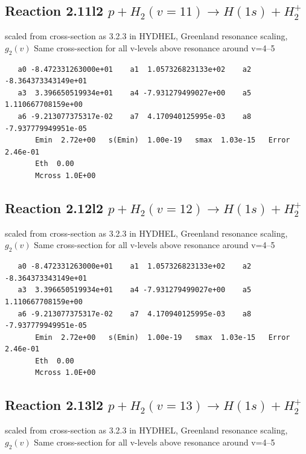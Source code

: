 \documentclass[12pt,dvipdfmx]{article}
\begin{document}
\subsection{
Reaction 2.11l2 $   p + H_2(v=11) \rightarrow H(1s) + H_2^+$}

scaled from cross-section as 3.2.3 in HYDHEL, Greenland resonance scaling, \cite{kn:Green} $g_2(v)$
Same cross-section for all v-levels above resonance around v=4--5

\begin{small}\begin{verbatim}
   a0 -8.472331263000e+01    a1  1.057326823133e+02    a2 -8.364373343149e+01
   a3  3.396650519934e+01    a4 -7.931279499027e+00    a5  1.110667708159e+00
   a6 -9.213077375317e-02    a7  4.170940125995e-03    a8 -7.937779949951e-05
       Emin  2.72e+00   s(Emin)  1.00e-19   smax  1.03e-15   Error  2.46e-01
       Eth  0.00
       Mcross 1.0E+00
\end{verbatim}\end{small}

\subsection{
Reaction 2.12l2 $   p + H_2(v=12) \rightarrow H(1s) + H_2^+$}

scaled from cross-section as 3.2.3 in HYDHEL, Greenland resonance scaling, \cite{kn:Green} $g_2(v)$
Same cross-section for all v-levels above resonance around v=4--5

\begin{small}\begin{verbatim}
   a0 -8.472331263000e+01    a1  1.057326823133e+02    a2 -8.364373343149e+01
   a3  3.396650519934e+01    a4 -7.931279499027e+00    a5  1.110667708159e+00
   a6 -9.213077375317e-02    a7  4.170940125995e-03    a8 -7.937779949951e-05
       Emin  2.72e+00   s(Emin)  1.00e-19   smax  1.03e-15   Error  2.46e-01
       Eth  0.00
       Mcross 1.0E+00
\end{verbatim}\end{small}

\subsection{
Reaction 2.13l2 $   p + H_2(v=13) \rightarrow H(1s) + H_2^+$}

scaled from cross-section as 3.2.3 in HYDHEL, Greenland resonance scaling, \cite{kn:Green} $g_2(v)$
Same cross-section for all v-levels above resonance around v=4--5
\end{document}
